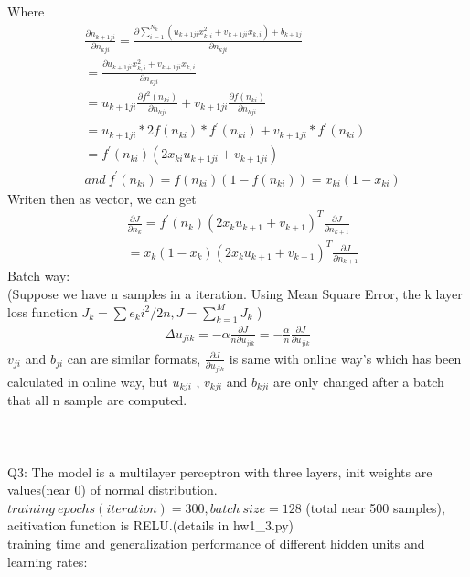 \documentclass{article}
\begin{document}
Where
\begin{equation*}
\begin{split} 
& \frac{\partial n_{k+1ji}}{\partial n_{kji}} = \frac{\partial  \sum _{i=1} ^{N_{k}} (u_{k+1ji} x^2 _{k,i} + v_{k+1ji} x_{k,i}) + b_{k+1j} }{\partial n_{kji}} \\ 
& = \frac{\partial u_{k+1ji}x^2 _{k,i} + v_{k+1ji} x_{k,i} }{\partial n_{kji}} \\
& = u_{k+1ji}\frac{\partial f^2 (n_{ki})}{\partial n_{kji}} + v_{k+1ji} \frac{\partial  f(n_{ki}) }{\partial n_{kji}} \\
& = u_{k+1ji} * 2f(n_{ki}) * f^{'}(n_{ki}) + v_{k+1ji}  * f^{'}(n_{ki}) \\
& = f^{'}(n_{ki})(2x_{ki}u_{k+1ji} + v_{k+1ji}) \\
& and ~ f^{'}(n_{ki}) = f(n_{ki}) (1 - f(n_{ki})) = x_{ki} (1 - x_{ki})
\end{split}
\end{equation*}
Writen then as vector, we can get  
\begin{equation*}
\begin{split} 
& \frac{\partial J}{\partial n_{k}} = {f^{'}(n_{k})(2x_{k}u_{k+1} + v_{k+1})}^T \frac{\partial J}{\partial n_{k+1}} \\
& = {x_{k} (1 - x_{k})(2x_{k}u_{k+1} + v_{k+1})}^T \frac{\partial J}{\partial n_{k+1}} 
\end{split}
\end{equation*}
Batch way: \\
(Suppose we have n samples in a iteration. Using Mean Square Error, the k layer loss function $J_k = \sum e_ki ^2 /2n , J = \sum _{k=1} ^M J_k $ )\\
\begin{equation*}
\begin{split} 
\Delta u_{jik} = - \alpha \frac{\partial J}{n \partial u_{jik}} = - \frac{\alpha}{n}  \frac{\partial J}{ \partial u_{jik}}
\end{split}
\end{equation*}
$v_{ji}$ and $b_{ji}$ can are similar formats, $\frac{\partial J}{\partial u_{jik}}$ is same with online way's which has been calculated in online way, but $u_{kji}$ , $v_{kji}$ and $b_{kji}$ are only changed after a batch that all n sample are computed.\\\\\\\\



\noindent Q3: The model is a multilayer perceptron with three layers, init weights are values(near 0) of normal distribution. $training~epochs(iteration) = 300 , batch~size = 128$ (total near 500 samples), acitivation function is RELU.(details in hw1\_3.py) \\
training time and generalization performance of different hidden units and learning rates:
\end{document}
